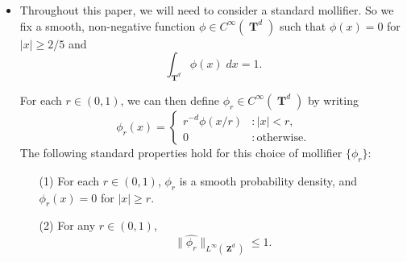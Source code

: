 \documentclass[12pt,reqno]{article}
\numberwithin{equation}{section}
\DeclareMathOperator{\ZZ}{\mathbf{Z}}
\DeclareMathOperator{\TT}{\mathbf{T}}
\newtheorem{theorem}{Theorem}
\begin{document}
\begin{itemize}
    \item Throughout this paper, we will need to consider a standard mollifier. So we fix a smooth, non-negative function $\phi \in C^\infty(\TT^d)$ such that $\phi(x) = 0$ for $|x| \geq 2/5$ and
%
\[ \int_{\TT^d} \phi(x)\; dx = 1. \]
%
\begin{comment}
\begin{theorem} \label{equationASFGCISIX}
    There exists a smooth probability density $\phi \in C^\infty(\TT^d)$ such that $\phi(x) = 0$ for $|x| \geq 2/5$, and such that for each $x \in \TT^d$
    \[ \sum_{k \in \{ 0, 1 \}^d} \phi(x + k/2) = 2^d. \]
\end{theorem}
\begin{proof}
    Let $\psi$ be a non-negative smooth function on $\TT$ such that $\psi(x) = \psi(- x)$ for all $x \in \TT$, $\psi(x) = 1$ for $|x| \leq 1/10$, $\psi(x) = 0$ for $|x| \geq 2/10$, and $0 \leq \psi(x) \leq 1$ for all $x \in \TT$. Then define $\eta$ to be the non-negative, $C^\infty$ function
    \[ \eta(x) = \frac{1}{2} - \frac{\psi(x) + \psi(x + 1/2)}{2}. \]
    If we define
    \[ \phi_0(x) = 2(\psi(x) + \eta(x)), \]
    then $\phi_0(x) + \phi_0(x + 1/2) = 2$ for all $x \in \TT$. Moreover, if $|x| \geq 2/5$, then $\psi(x) = 0$, and since this implies $|x + 1/2| \leq 1/10$, we find $\eta(x) = 0$. Thus $\phi_0(x) = 0$ for $|x| \geq 2/5$. But the condition $\phi_0(x) + \phi_0(x + 1/2) = 2$ implies that $\phi_0$ is a probability density function. Thus it suffices to define
    \[ \phi(x_1, \dots, x_d) = \phi_0(x_1) \dots \phi_0(x_d). \qedhere \]
\end{proof}
\end{comment}
%
For each $r \in (0,1)$, we can then define $\phi_r \in C^\infty(\TT^d)$ by writing
%
\[ \phi_r(x) = \begin{cases} r^{-d} \phi(x/r) &: |x| < r, \\ 0 &: \text{otherwise}. \end{cases} \]
%
The following standard properties hold for this choice of mollifier $\{ \phi_r \}$:
%
\begin{enumerate}
    \item[(1)] For each $r \in (0,1)$, $\phi_r$ is a smooth probability density, and $\phi_r(x) = 0$ for $|x| \geq r$.

    \item[(2)] For any $r \in (0,1)$,
    \begin{equation} \label{equationDIOJAOIJVIV23242}
        \| \widehat{\phi_r} \|_{L^\infty(\ZZ^d)} \leq 1.
    \end{equation}


\end{enumerate}
\end{itemize}
\end{document}
